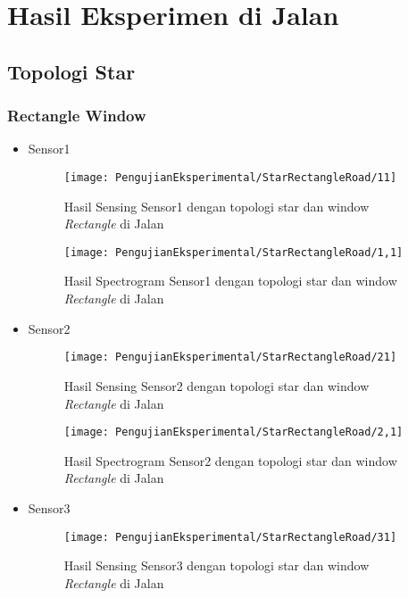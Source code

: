 \chapter{Hasil Eksperimen di Jalan}
\label{lamp:C}
\section{Topologi Star}
\subsection{Rectangle Window}
\begin{itemize}
\item Sensor1
\begin{figure}[H]
	\centering
	\texttt{[image: PengujianEksperimental/StarRectangleRoad/11]}
	\caption[Hasil Sensing Sensor1 dengan topologi star dan window {\it Rectangle} di Jalan]{Hasil Sensing Sensor1 dengan topologi star dan window {\it Rectangle} di Jalan} 
	\label{fig:hasilJalanStarRect11}
\end{figure}

\begin{figure}[H]
	\centering
	\texttt{[image: PengujianEksperimental/StarRectangleRoad/1,1]}
	\caption[Hasil Spectrogram Sensor1 dengan topologi star dan window {\it Rectangle} di Jalan]{Hasil Spectrogram Sensor1 dengan topologi star dan window {\it Rectangle} di Jalan} 
	\label{fig:hasilJalanStarRect1,1}
\end{figure}

\item Sensor2
\begin{figure}[H]
	\centering
	\texttt{[image: PengujianEksperimental/StarRectangleRoad/21]}
	\caption[Hasil Sensing Sensor2 dengan topologi star dan window {\it Rectangle} di Jalan]{Hasil Sensing Sensor2 dengan topologi star dan window {\it Rectangle} di Jalan} 
	\label{fig:hasilJalanStarRect21}
\end{figure}

\begin{figure}[H]
	\centering
	\texttt{[image: PengujianEksperimental/StarRectangleRoad/2,1]}
	\caption[Hasil Spectrogram Sensor2 dengan topologi star dan window {\it Rectangle} di Jalan]{Hasil Spectrogram Sensor2 dengan topologi star dan window {\it Rectangle} di Jalan} 
	\label{fig:hasilJalanStarRect2,1}
\end{figure}

\item Sensor3
\begin{figure}[H]
	\centering
	\texttt{[image: PengujianEksperimental/StarRectangleRoad/31]}
	\caption[Hasil Sensing Sensor3 dengan topologi star dan window {\it Rectangle} di Jalan]{Hasil Sensing Sensor3 dengan topologi star dan window {\it Rectangle} di Jalan} 
	\label{fig:hasilJalanStarRect31}
\end{figure}


\end{itemize}

